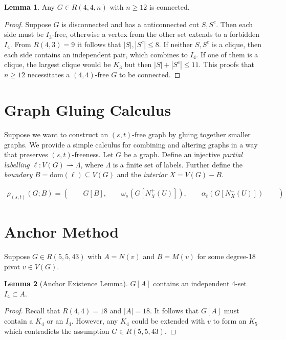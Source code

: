 \documentclass[a4paper]{article}
\newcommand{\abs}[1]{\left|#1\right|}
\theoremstyle{definition}
\newtheorem{lemma}{Lemma}
\begin{document}
\begin{lemma}
	Any $G \in R(4, 4, n)$ with $n \geqslant 12$ is connected.
\end{lemma}
\begin{proof}
	Suppose $G$ is disconnected and has a anticonnected cut $S, S^c$.
	Then each side must be $I_3$-free, otherwise a vertex from the other set extends to a forbidden $I_4$.
	From $R(4, 3) = 9$ it follows that $\abs{S}, \abs{S^c} \leqslant 8$.
	If neither $S, S^c$ is a clique, then each side contains an independent pair, which combines to $I_4$.
	If one of them is a clique, the largest clique would be $K_3$ but then $\abs{S} + \abs{S^c} \leqslant 11$.
	This proofs that $n \geqslant 12$ necessitates a $(4, 4)$-free $G$ to be connected.
\end{proof}

\newpage
\section{Graph Gluing Calculus}

Suppose we want to construct an $(s,t)$-free graph by gluing together smaller graphs.
We provide a simple calculus for combining and altering graphs in a way that preserves $(s, t)$-freeness.
Let $G$ be a graph.
Define an injective \emph{partial labelling} $\ell \colon V(G) \rightharpoonup \Lambda$,
where $\Lambda$ is a finite set of labels. Further define the \emph{boundary}
$B = \text{dom}(\ell) \subseteq V(G)$ and the \emph{interior} $X = V(G) - B$.

\begin{align*}
	\rho_{(s,t)}(G; B) = (\qquad G[B], \qquad \omega_s(G[N_X^+(U)]), \qquad \alpha_t(G[N_X^-(U)]) \qquad)
\end{align*}

\section{Anchor Method}

Suppose $G \in R(5, 5, 43)$ with $A = N(v)$ and $B = M(v)$ for some degree-18 pivot $v \in V(G)$.

\begin{lemma}[Anchor Existence Lemma]\label{A-has-I4}
	$G[A]$ contains an independent 4-set $I_4 \subset A$.
\end{lemma}
\begin{proof}
	Recall that $R(4, 4) = 18$ and $|A| = 18$.
	It follows that $G[A]$ must contain a $K_4$ or an $I_4$.
	However, any $K_4$ could be extended with $v$ to form an $K_5$
	which contradicts the assumption $G \in R(5, 5, 43)$.
\end{proof}
\end{document}
